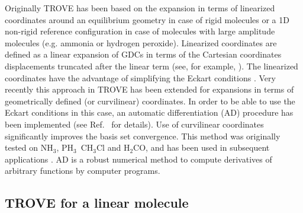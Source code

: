 \documentclass[12pt]{article}
\newcommand{\2}{$_{2}$}
\newcommand{\3}{$_{3}$}
\newcommand{\4}{$_{4}$}
\begin{document}
Originally TROVE has been based on the expansion in terms of
linearized coordinates around an equilibrium geometry in case of rigid
molecules or a 1D non-rigid reference configuration
\cite{83Jensen.method} in case of molecules with large amplitude
molecules (e.g. ammonia or hydrogen peroxide). Linearized coordinates
are defined as a linear expansion of GDCs in terms of the Cartesian
coordinates displacements truncated after the linear term (see, for
example, \cite{98BuJexx.method}). The linearized coordinates have the
advantage of simplifying the Eckart conditions \cite{TROVE}.  Very
recently this approach in TROVE has been extended for expansions in
terms of geometrically defined (or curvilinear) coordinates. In order
to be able to use the Eckart conditions in this case, an automatic
differentiation (AD) procedure has been implemented (see
Ref.~\cite{15YaYuxx.method} for details). Use of curvilinear coordinates
significantly improves the basis set convergence\cite{15YaYuxx.method}.
This method was originally tested on
NH\3, PH\3\, CH\3Cl and H\2CO, and has been used in subsequent
applications \cite{15OwYuYa.SiH4,15OwYuYa.CH3Cl,jt634}. AD is a robust
numerical method to compute derivatives of arbitrary functions by
computer programs.



\subsection{TROVE for a linear molecule}
\end{document}
